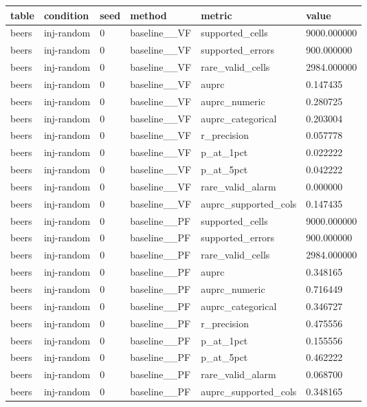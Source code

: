 \begin{tabular}{llllll}
\hline
table & condition & seed & method & metric & value \\
\hline
beers & inj-random & 0 & baseline\_\_VF & supported\_cells & 9000.000000 \\
beers & inj-random & 0 & baseline\_\_VF & supported\_errors & 900.000000 \\
beers & inj-random & 0 & baseline\_\_VF & rare\_valid\_cells & 2984.000000 \\
beers & inj-random & 0 & baseline\_\_VF & auprc & 0.147435 \\
beers & inj-random & 0 & baseline\_\_VF & auprc\_numeric & 0.280725 \\
beers & inj-random & 0 & baseline\_\_VF & auprc\_categorical & 0.203004 \\
beers & inj-random & 0 & baseline\_\_VF & r\_precision & 0.057778 \\
beers & inj-random & 0 & baseline\_\_VF & p\_at\_1pct & 0.022222 \\
beers & inj-random & 0 & baseline\_\_VF & p\_at\_5pct & 0.042222 \\
beers & inj-random & 0 & baseline\_\_VF & rare\_valid\_alarm & 0.000000 \\
beers & inj-random & 0 & baseline\_\_VF & auprc\_supported\_cols & 0.147435 \\
beers & inj-random & 0 & baseline\_\_PF & supported\_cells & 9000.000000 \\
beers & inj-random & 0 & baseline\_\_PF & supported\_errors & 900.000000 \\
beers & inj-random & 0 & baseline\_\_PF & rare\_valid\_cells & 2984.000000 \\
beers & inj-random & 0 & baseline\_\_PF & auprc & 0.348165 \\
beers & inj-random & 0 & baseline\_\_PF & auprc\_numeric & 0.716449 \\
beers & inj-random & 0 & baseline\_\_PF & auprc\_categorical & 0.346727 \\
beers & inj-random & 0 & baseline\_\_PF & r\_precision & 0.475556 \\
beers & inj-random & 0 & baseline\_\_PF & p\_at\_1pct & 0.155556 \\
beers & inj-random & 0 & baseline\_\_PF & p\_at\_5pct & 0.462222 \\
beers & inj-random & 0 & baseline\_\_PF & rare\_valid\_alarm & 0.068700 \\
beers & inj-random & 0 & baseline\_\_PF & auprc\_supported\_cols & 0.348165 \\

\end{tabular}
